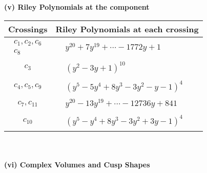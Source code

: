 \documentclass[1p]{elsarticle_modified}
\theoremstyle{definition}
\begin{document}
\newpage\renewcommand{\arraystretch}{1}
\flushleft \textbf{(v) Riley Polynomials at the component}\newline \\
\begin{tabular}{m{50pt}|m{274pt}}
Crossings & \hspace{64pt}Riley Polynomials at each crossing \\
\hline $$\begin{aligned}c_{1},c_{2},c_{6}\\c_{8}\end{aligned}$$&$\begin{aligned}
&y^{20}+7 y^{19}+\cdots-1772 y+1
\end{aligned}$\\
\hline $$\begin{aligned}c_{3}\end{aligned}$$&$\begin{aligned}
&(y^2-3 y+1)^{10}
\end{aligned}$\\
\hline $$\begin{aligned}c_{4},c_{5},c_{9}\end{aligned}$$&$\begin{aligned}
&(y^5-5 y^4+8 y^3-3 y^2- y-1)^4
\end{aligned}$\\
\hline $$\begin{aligned}c_{7},c_{11}\end{aligned}$$&$\begin{aligned}
&y^{20}-13 y^{19}+\cdots-12736 y+841
\end{aligned}$\\
\hline $$\begin{aligned}c_{10}\end{aligned}$$&$\begin{aligned}
&(y^5- y^4+8 y^3-3 y^2+3 y-1)^4
\end{aligned}$\\
\hline
\end{tabular}\\~\\
\newpage\flushleft \textbf{(vi) Complex Volumes and Cusp Shapes}
\end{document}
